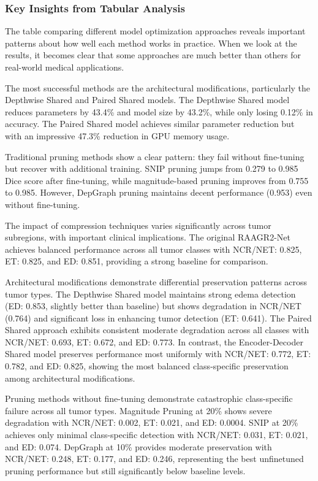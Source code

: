 \documentclass[12pt,a4paper]{article}
\begin{document}
\begin{enumerate}
\subsubsection{Key Insights from Tabular Analysis}

The table comparing different model optimization approaches reveals important patterns about how well each method works in practice. When we look at the results, it becomes clear that some approaches are much better than others for real-world medical applications.

The most successful methods are the architectural modifications, particularly the Depthwise Shared and Paired Shared models. The Depthwise Shared model reduces parameters by 43.4\% and model size by 43.2\%, while only losing 0.12\% in accuracy. The Paired Shared model achieves similar parameter reduction but with an impressive 47.3\% reduction in GPU memory usage.

Traditional pruning methods show a clear pattern: they fail without fine-tuning but recover with additional training. SNIP pruning jumps from 0.279 to 0.985 Dice score after fine-tuning, while magnitude-based pruning improves from 0.755 to 0.985. However, DepGraph pruning maintains decent performance (0.953) even without fine-tuning.

The impact of compression techniques varies significantly across tumor subregions, with important clinical implications. The original RAAGR2-Net achieves balanced performance across all tumor classes with NCR/NET: 0.825, ET: 0.825, and ED: 0.851, providing a strong baseline for comparison.

Architectural modifications demonstrate differential preservation patterns across tumor types. The Depthwise Shared model maintains strong edema detection (ED: 0.853, slightly better than baseline) but shows degradation in NCR/NET (0.764) and significant loss in enhancing tumor detection (ET: 0.641). The Paired Shared approach exhibits consistent moderate degradation across all classes with NCR/NET: 0.693, ET: 0.672, and ED: 0.773. In contrast, the Encoder-Decoder Shared model preserves performance most uniformly with NCR/NET: 0.772, ET: 0.782, and ED: 0.825, showing the most balanced class-specific preservation among architectural modifications.

Pruning methods without fine-tuning demonstrate catastrophic class-specific failure across all tumor types. Magnitude Pruning at 20\% shows severe degradation with NCR/NET: 0.002, ET: 0.021, and ED: 0.0004. SNIP at 20\% achieves only minimal class-specific detection with NCR/NET: 0.031, ET: 0.021, and ED: 0.074. DepGraph at 10\% provides moderate preservation with NCR/NET: 0.248, ET: 0.177, and ED: 0.246, representing the best unfinetuned pruning performance but still significantly below baseline levels.


\end{enumerate}
\end{document}
